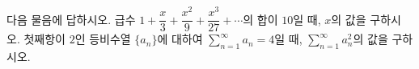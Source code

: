 다음 물음에 답하시오.
 급수 $1+\dfrac{x}{3}+\dfrac{x^{2}}{9}+\dfrac{x^{3}}{27}+\cdots$의 합이 $10$일 때, $x$의 값을 구하시오.
 첫째항이 $2$인 등비수열 $\{a_n\}$에 대하여 $\displaystyle\sum_{n=1}^{\infty}a_n=4$일 때, $\displaystyle\sum_{n=1}^{\infty}a_n^{2}$의 값을 구하시오.
